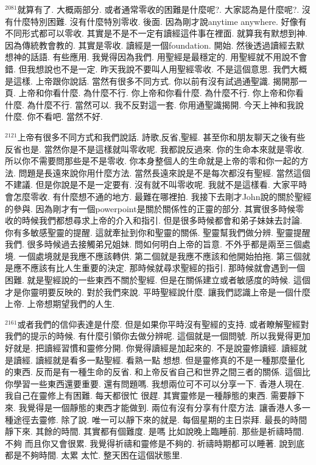 \documentclass{book}
\begin{document}
$^{2081}$就算有了.
大概兩部分.
或者通常零收的困難是什麼呢?.
大家認為是什麼呢?.
沒有什麼特別困難.
沒有什麼特別零收.
後面.
因為剛才說anytime anywhere.
好像有不同形式都可以零收.
其實是不是不一定有讀經這件事在裡面.
就算我有默想到神.
因為傳統教會教的.
其實是零收.
讀經是一個foundation.
開始.
然後透過讀經去默想神的話語.
有些應用.
我覺得因為我們.
用聖經是最穩定的.
用聖經就不用說不會錯.
但我想說也不是一定.
昨天我說不要叫人用聖經零收.
不是這個意思.
我們大概是這樣.
上帝跟你說話.
當然有很多不同方式.
你以前有沒有試過通聖識.
揭開那一頁.
上帝和你看什麼.
為什麼不行.
你上帝和你看什麼.
為什麼不行.
你上帝和你看什麼.
為什麼不行.
當然可以.
我不反對這一套.
你用通聖識揭開.
今天上神和我說什麼.
你不看吧.
當然不好.

$^{2121}$上帝有很多不同方式和我們說話.
詩歌,反省,聖經.
甚至你和朋友聊天之後有些反省也是.
當然你是不是這樣就叫零收呢.
我都說反過來.
你的生命本來就是零收.
所以你不需要問那些是不是零收.
你本身整個人的生命就是上帝的零和你一起的方法.
問題是長遠來說你用什麼方法.
當然長遠來說是不是每次都沒有聖經.
當然這個不建議.
但是你說是不是一定要有.
沒有就不叫零收呢.
我就不是這樣看.
大家平時會怎麼零收.
有什麼想不通的地方.
最難在哪裡拍.
我接下去剛才John說的關於聖經的參與.
因為剛才有一個powerpoint是關於關係性的正靈的部分.
其實很多時候零收的時候我們都想尋求上帝的介入和指引.
但是很多時候都會和弟子妹妹去討論.
你有多敏感聖靈的提醒.
這就牽扯到你和聖靈的關係.
聖靈幫我們做分辨.
聖靈提醒我們.
很多時候過去接觸弟兄姐妹.
問如何明白上帝的旨意.
不外乎都是兩至三個處境.
一個處境就是我應不應該轉供.
第二個就是我應不應該和他開始拍拖.
第三個就是應不應該有比人生重要的決定.
那時候就尋求聖經的指引.
那時候就會遇到一個困難.
就是聖經說的一些東西不關於聖經.
但是在關係建立或者敏感度的時候.
這個才是你靈明要反映的.
對於我們來說.
平時聖經說什麼.
讓我們認識上帝是一個什麼上帝.
上帝想期望我們的人生.

$^{2161}$或者我們的信仰表達是什麼.
但是如果你平時沒有聖經的支持.
或者瞭解聖經對我們的提示的時候.
有什麼引領你去做分辨呢.
這個就是一個問號.
所以我覺得更加好就是.
把讀經習慣和靈修分開.
你覺得讀經是加起來的.
不是說靈修讀經.
讀經就是讀經.
讀經就是看多一點聖經.
看熟一點 想想.
但是靈修真的不是一種那麼量化的東西.
反而是有一種生命的反省.
和上帝反省自己和世界之間三者的關係.
這個比你學習一些東西還要重要.
還有問題嗎.
我想兩位可不可以分享一下.
香港人現在.
我自己在靈修上有困難.
每天都很忙 很趕.
其實靈修是一種靜態的東西.
需要靜下來.
我覺得是一個靜態的東西才能做到.
兩位有沒有分享有什麼方法.
讓香港人多一種途徑去靈修.
除了說.
唯一可以靜下來的就是.
每個星期的主日崇拜.
最長的時間靜下來.
其餘的時間.
其實都有個難度.
是嗎 比如說晚上臨睡前.
那些是祈禱時間.
不夠 而且你又會很累.
我覺得祈禱和靈修是不夠的.
祈禱時期都可以睡著.
說到底都是不夠時間.
太累 太忙.
整天困在這個狀態里.
\end{document}
